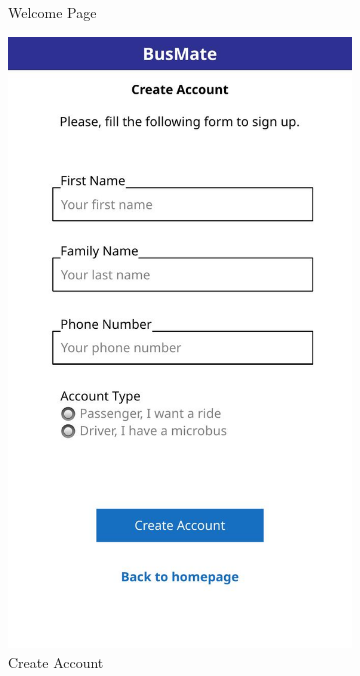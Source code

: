 \documentclass{BusMateSRS}
\begin{document}
\begin{figure}[ht]
\begin{subfigure}[b]{0.3\textwidth}
    \caption{Welcome Page}
    \label{fig:ui1}
  \end{subfigure}
  \hfill
  \begin{subfigure}[b]{0.3\textwidth}
    \centering
    \includegraphics[width=\textwidth]{images-ui/ui-out-2.jpg}
    \caption{Create Account}
    \label{fig:ui2}
  \end{subfigure}
  \hfill
  \begin{subfigure}[b]{0.3\textwidth}
    \centering

\end{subfigure}
\end{figure}
\end{document}

